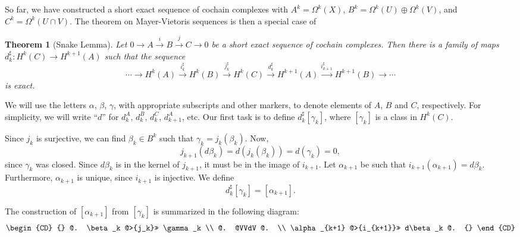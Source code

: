 \documentclass[12pt]{amsbook}
\newtheorem{thm}{Theorem}[section]
\theoremstyle{definition}
\begin{document}
So far, we have constructed a short exact sequence of cochain complexes 
with $A^k=\Omega^k(X)$, $B^k=\Omega^k(U) \oplus \Omega^k(V)$, and $C^k=
\Omega^k(U \cap V)$. The theorem on Mayer-Vietoris sequences is then a 
special case of 

\begin{thm}[Snake Lemma] Let $0 \rightarrow A \xrightarrow i B 
\xrightarrow j C \rightarrow 0$ be a short exact sequence of cochain complexes.
Then there is a family of maps $d_k^\sharp: H^k(C) \to H^{k+1}(A)$ such that 
the sequence $$\cdots \to H^k(A) \xrightarrow {i_k^\sharp} H^k(B)   
\xrightarrow {j_k^\sharp} H^k(C) \xrightarrow {d_k^\sharp} H^{k+1}(A)  
\xrightarrow{ i_{k+1}^\sharp} H^{k+1}(B) \rightarrow \cdots$$
is exact. 
\end{thm}


We will use the letters
$\alpha$, $\beta$, $\gamma$, with appropriate subscripts and other
markers, to denote elements of $A$, $B$ and $C$, respectively.  For simplicity, we will 
write ``$d$'' for $d_k^A$, $d_k^B$, $d_k^C$, $d_{k+1}^A$, etc. 
Our first task is to define $d_k^\sharp[\gamma_k]$, where 
$[\gamma_k]$ is a class in $H^k(C)$. 

Since $j_k$ is surjective, we can find $\beta_k \in B^k$ such that 
$\gamma_k=j_k(\beta_k)$. Now, 
$$ j_{k+1}(d\beta_k) = d(j_k(\beta_k))=d(\gamma_k)=0,$$
since $\gamma_k$ was closed. Since $d\beta_k$ is in the kernel of $j_{k+1}$,
it must be in the image of $i_{k+1}$. Let $\alpha_{k+1}$ be such that 
$i_{k+1}(\alpha_{k+1})=d\beta_k$. Furthermore, $\alpha_{k+1}$ is unique, since
$i_{k+1}$ is injective. We define
$$ d_k^\sharp[\gamma_k] = [\alpha_{k+1}].$$

The construction of $[\alpha_{k+1}]$ from $[\gamma_k]$ is summarized in the following diagram:
$$ \begin{CD}
{} @. \beta_k @>{j_k}>> \gamma_k \\
@. @VVdV @. \\
\alpha_{k+1} @>{i_{k+1}}>> d\beta_k @. {}
\end{CD}
$$
\end{document}
